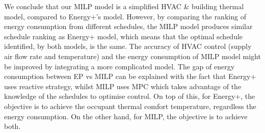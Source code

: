 We conclude that our MILP model is a simplified HVAC \& building thermal model, compared to Energy+'s model. However, by comparing the ranking of energy consumption from different schedules, the MILP model produces similar schedule ranking as Energy+ model, which means that the optimal schedule identified, by both models, is the same. The accuracy of HVAC control (supply air flow rate and temperature)  and the energy consumption of MILP model might be improved by integrating a more complicated model.
The gap of energy consumption between EP vs MILP can be explained with the fact that Energy+ uses reactive strategy, whilst MILP uses MPC which takes advantage of the knowledge of the schedules to optimise control. On top of this, for Energy+, the objective is to achieve the occupant thermal comfort temperature, regardless the energy consumption. On the other hand, for MILP, the objective is to achieve both.








